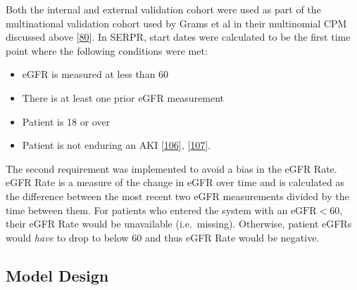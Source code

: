 \documentclass[12pt,PhD,twoside,openright]{muthesis}
\providecommand{\tightlist}{%
  \setlength{\itemsep}{0pt}\setlength{\parskip}{0pt}}
\begin{document}
Both the internal and external validation cohort were used as part of the multinational validation cohort used by Grams et al in their multinomial CPM discussed above {[}\protect\hyperlink{ref-grams_predicting_2018}{80}{]}. In SERPR, start dates were calculated to be the first time point where the following conditions were met:
\begin{itemize}
\tightlist
\item
  eGFR is measured at less than 60
\item
  There is at least one prior eGFR measurement
\item
  Patient is 18 or over
\item
  Patient is not enduring an AKI {[}\protect\hyperlink{ref-forni_renal_2017-1}{106}{]}, {[}\protect\hyperlink{ref-noauthor_kdigo_2012}{107}{]}.
\end{itemize}
The second requirement was implemented to avoid a bias in the eGFR Rate. eGFR Rate is a measure of the change in eGFR over time and is calculated as the difference between the most recent two eGFR measurements divided by the time between them. For patients who entered the system with an \(\textrm{eGFR} < 60\), their eGFR Rate would be unavailable (i.e.~missing). Otherwise, patient eGFRs would \emph{have} to drop to below 60 and thus eGFR Rate would be negative.

\hypertarget{model-design}{%
\subsection{Model Design}\label{model-design}}
\end{document}
